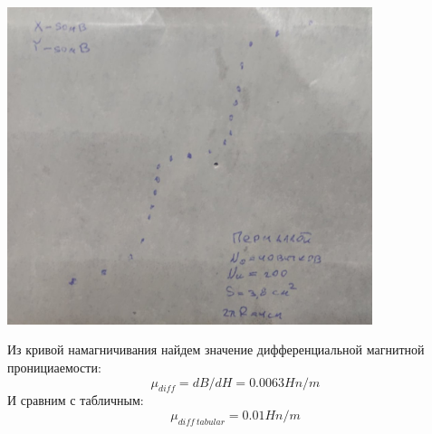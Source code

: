 \documentclass[12pt]{article}
\begin{document}
\begin{minipage}{0.5\textwidth}
\begin{center}
    \includegraphics[width=0.8\textwidth]{perm.jpg}
    \label{fer}
\end{center}
\end{minipage}
\begin{minipage}{0.5\textwidth}
Из кривой намагничивания найдем значение дифференциальной магнитной пронициаемости:
    \begin{equation*}
        \mu_{diff} = dB/dH = 0.0063 Hn/m
    \end{equation*}
И сравним с табличным:
    \begin{equation*}
        \mu_{diff\: tabular} =  0.01 Hn/m
    \end{equation*}
\end{minipage}
\end{document}

